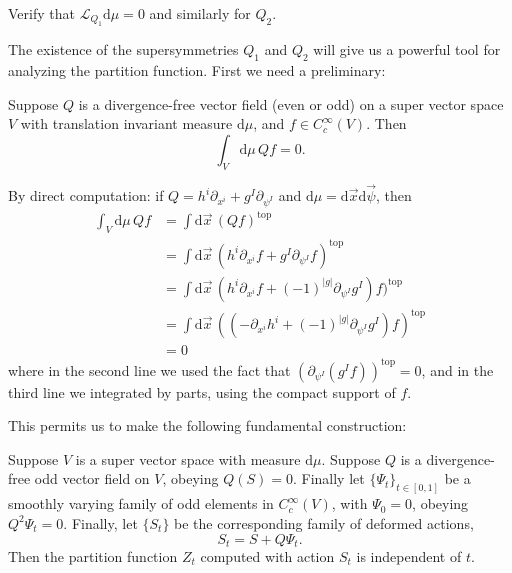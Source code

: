 \documentclass[12pt,letterpaper,reqno]{article}
\numberwithin{equation}{section}
\newcommand{\cL}{\ensuremath{\mathcal L}}
\newcommand{\de}{\mathrm{d}}
\newcommand{\rmtop}{\mathrm{top}}
\newcommand{\abs}[1]{\lvert#1\rvert}
\begin{document}
\begin{exercise} Verify that $\cL_{Q_1} \de \mu = 0$ and similarly
for $Q_2$.
\end{exercise}

The existence of the supersymmetries $Q_1$ and $Q_2$ will give us a 
powerful tool for analyzing the partition function.
First we need a preliminary:

\begin{lem} Suppose $Q$ is a divergence-free vector field
(even or odd)
on a super vector space $V$ with translation invariant measure $\de \mu$, 
and $f \in C^\infty_c(V)$. Then
\begin{equation}
  \int_V \de \mu \, Qf = 0.
\end{equation}
\end{lem}

\begin{pf} By direct computation: if $Q = h^i \partial_{x^i} + g^I \partial_{\psi^I}$ and $\de \mu = \de \vec{x} \de \vec{\psi}$, then
\begin{align}
  \int_V \de \mu \, Qf &= \int \de \vec{x} \, (Qf)^\rmtop \\
  &= \int \de \vec{x} \, (h^i \partial_{x^i} f + g^I \partial_{\psi^I} f)^\rmtop \\
  &= \int \de \vec{x} \, (h^i \partial_{x^i} f + (-1)^{\abs{g}} \partial_{\psi^I} g^I) f)^\rmtop \\
  &= \int \de \vec{x} \, ((- \partial_{x^i} h^i + (-1)^{\abs{g}} \partial_{\psi^I} g^I) f)^\rmtop \\
  &= 0 
\end{align}
where in the second line we used the fact that $(\partial_{\psi^I} (g^I f))^\rmtop = 0$, and in the third line we integrated by parts, 
using the compact support of $f$.
\end{pf}

This permits us to make the following fundamental construction:
\begin{prop} \label{prop:Z-deformation-invariance}
Suppose $V$ is a super vector space with measure $\de \mu$.
Suppose $Q$ is a divergence-free odd vector field on $V$,
obeying $Q(S) = 0$.
Finally let $\{\Psi_t\}_{t \in [0,1]}$ be a smoothly varying family 
of odd elements in $C^\infty_c(V)$, with $\Psi_0 = 0$, obeying
$Q^2 \Psi_t = 0$.
Finally, let $\{S_t\}$ be the corresponding family of deformed actions,
\begin{equation} \label{eq:S-deformation}
  S_t = S + Q \Psi_t.
\end{equation}
Then the partition function $Z_t$ computed with action $S_t$
is independent of $t$.
\end{prop}
\end{document}
